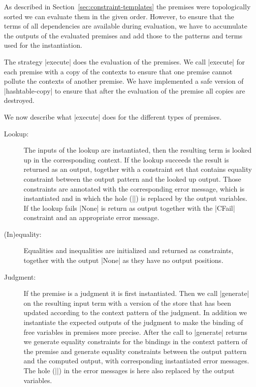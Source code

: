 As described in Section~\ref{sec:constraint-templates} the premises
were topologically sorted we can evaluate them in the given
order. However, to ensure that the terms of all dependencies are
available during evaluation, we have to accumulate the outputs of the
evaluated premises and add those to the patterns and terms used for
the instantiation.

The strategy \code|execute| does the evaluation of the premises. We
call \code|execute| for each premise with a copy of the contexts to
ensure that one premise cannot pollute the contexts of another
premise. We have implemented a safe version of \code|hashtable-copy|
to ensure that after the evaluation of the premise all copies are
destroyed.

We now describe what \code|execute| does for the different types of
premises.

\begin{description}
\item[Lookup:] The inputs of the lookup are instantiated, then the
  resulting term is looked up in the corresponding context. If the
  lookup succeeds the result is returned as an output, together with a
  constraint set that contains equality constraint between the output
  pattern and the looked up output. Those constraints are annotated
  with the corresponding error message, which is instantiated and in
  which the hole (\code|{}|) is replaced by the output variables. If
  the lookup fails \code|None| is return as output together with the
  \code|CFail| constraint and an appropriate error message.
\item[(In)equality:] Equalities and inequalities are initialized and
  returned as constraints, together with the output \code|None| as
  they have no output positions.
\item[Judgment:] If the premise is a judgment it is first
  instantiated. Then we call \code|generate| on the resulting input
  term with a version of the store that has been updated according to
  the context pattern of the judgment. In addition we instantiate the
  expected outputs of the judgment to make the binding of free
  variables in premises more precise. After the call to
  \code|generate| returns we generate equality constraints for the
  bindings in the context pattern of the premise and generate equality
  constraints between the output pattern and the computed output, with
  corresponding instantiated error messages. 
  The hole (\code|{}|) in the error messages is here also replaced by
  the output variables.
\end{description}

